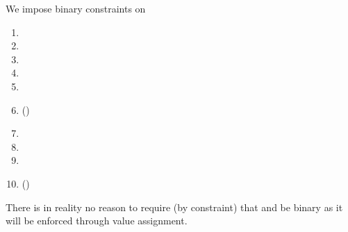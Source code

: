 We impose binary constraints on
\begin{multicols}{2}
	\begin{enumerate}
		\item \txIsLegacy{}
		\item \txIsAccessSet{}
		\item \txIsTypeTwo{}
		\item \txIsDeployment{}
		\item \txStatusCode{}
		\item \txCopyTxcd{} \quad (\trash)
		\item \txRequiresEvmExecution{}
		\item \eucFlag{}
		\item \wcpFlag{}
		\item \isLastTxOfBlock{} \quad (\trash)
	\end{enumerate}
\end{multicols}
\saNote{}
There is in reality no reason to require (by constraint) that \txCopyTxcd{} and \isLastTxOfBlock{} be binary as it will be enforced through value assignment.
